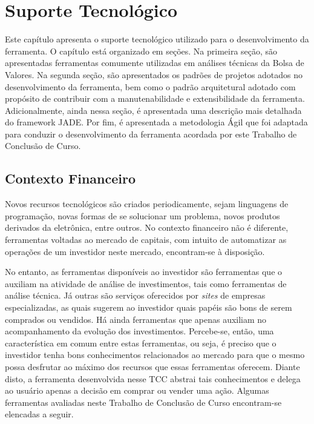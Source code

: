 \chapter[SUPORTE TECNOLÓGICO]{Suporte Tecnológico}

Este capítulo apresenta o suporte tecnológico utilizado para o desenvolvimento da ferramenta. O capítulo está organizado em seções. Na primeira seção, são apresentadas ferramentas comumente utilizadas em análises técnicas da Bolsa de Valores. Na segunda seção, são apresentados os padrões de projetos adotados no desenvolvimento da ferramenta, bem como o padrão arquitetural adotado com propósito de contribuir com a manutenabilidade e extensibilidade da ferramenta. Adicionalmente, ainda nessa seção, é apresentada uma descrição mais detalhada do framework JADE. Por fim, é apresentada a metodologia Ágil que foi adaptada para conduzir o desenvolvimento da ferramenta acordada por este Trabalho de Conclusão de Curso.


\section{Contexto Financeiro}

Novos recursos tecnológicos são criados periodicamente, sejam linguagens de programação, novas formas de se solucionar um problema, novos produtos derivados da eletrônica, entre outros. No contexto financeiro não é diferente, ferramentas voltadas ao mercado de capitais, com intuito de automatizar as operações de um investidor neste mercado, encontram-se à disposição.

No entanto, as ferramentas disponíveis ao investidor são ferramentas que o auxiliam na atividade de análise de investimentos, tais como ferramentas de análise técnica. Já outras são serviços oferecidos por \textit{sites} de empresas especializadas, as quais sugerem ao investidor quais papéis são bons de serem comprados ou vendidos. Há ainda ferramentas que apenas auxiliam no acompanhamento da evolução dos investimentos. Percebe-se, então, uma característica em comum entre estas ferramentas, ou seja, é preciso que o investidor tenha bons conhecimentos relacionados ao mercado para que o mesmo possa desfrutar ao máximo dos recursos que essas ferramentas oferecem. Diante disto, a ferramenta desenvolvida nesse TCC abstrai tais conhecimentos e delega ao usuário apenas a decisão em comprar ou vender uma ação. Algumas ferramentas avaliadas neste Trabalho de Conclusão de Curso encontram-se elencadas a seguir.

